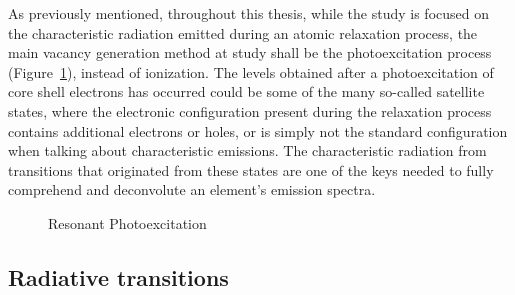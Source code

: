 As previously mentioned, throughout this thesis, while the study is focused on the characteristic radiation emitted during an atomic relaxation process, the main vacancy generation method at study shall be the photoexcitation process (Figure~\ref{fig:exc}), instead of ionization. The levels obtained after a photoexcitation of core shell electrons has occurred could be some of the many so-called satellite states, where the electronic configuration present during the relaxation process contains additional electrons or holes, or is simply not the standard configuration when talking about characteristic emissions.
The characteristic radiation from transitions that originated from these states are one of the keys needed to fully comprehend and deconvolute an element's emission spectra.


\begin{figure}[h!]
    \centering
    \caption{Resonant Photoexcitation}\label{fig:exc}
\end{figure}

\subsection{Radiative transitions}



